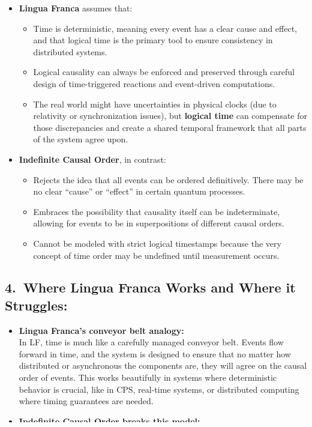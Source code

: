\documentclass[../../../OAE-SPEC-MAIN.tex]{subfiles}
\begin{document}
\begin{itemize}[leftmargin=1.5em]
\item \textbf{Lingua Franca} assumes that:
  \begin{itemize}[leftmargin=1.25em]
  \item Time is deterministic, meaning every event has a clear cause and effect, and that logical time is the primary tool to ensure consistency in distributed systems.
  \item Logical causality can always be enforced and preserved through careful design of time-triggered reactions and event-driven computations.
  \item The real world might have uncertainties in physical clocks (due to relativity or synchronization issues), but \textbf{logical time} can compensate for those discrepancies and create a shared temporal framework that all parts of the system agree upon.
  \end{itemize}
\item \textbf{Indefinite Causal Order}, in contrast:
  \begin{itemize}[leftmargin=1.25em]
  \item Rejects the idea that all events can be ordered definitively. There may be no clear ``cause'' or ``effect'' in certain quantum processes.
  \item Embraces the possibility that causality itself can be indeterminate, allowing for events to be in superpositions of different causal orders.
  \item Cannot be modeled with strict logical timestamps because the very concept of time order may be undefined until measurement occurs.
  \end{itemize}
\end{itemize}

\subsection*{4.\ Where Lingua Franca Works and Where it Struggles:}

\begin{itemize}[leftmargin=1.5em]
\item \textbf{Lingua Franca's conveyor belt analogy:}\\
  In LF, time is much like a carefully managed conveyor belt. Events flow forward in time, and the system is designed to ensure that no matter how distributed or asynchronous the components are, they will agree on the causal order of events. This works beautifully in systems where deterministic behavior is crucial, like in CPS, real-time systems, or distributed computing where timing guarantees are needed.

\item \textbf{Indefinite Causal Order breaks this model:}\\
  The assumption behind LF that all events can be deterministically ordered along a logical timeline fundamentally breaks down when applied to scenarios involving indefinite causal order. Quantum systems with indefinite causality cannot be modeled using LF's deterministic logical time, as there may not be any single ``correct'' timeline.
\end{itemize}
\end{document}
